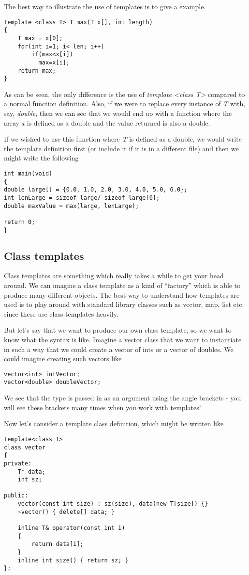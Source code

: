 The best way to illustrate the use of templates is to give a example. 

\begin{verbatim}
template <class T> T max(T x[], int length) 
{
	T max = x[0];
	for(int i=1; i< len; i++)
		if(max<x[i])
		  max=x[i];
	return max;
}
\end{verbatim}
As can be seen, the only difference is the use of \emph{template <class T>} compared to a normal function definition. Also, if we were to replace every instance of \emph{T} with, say, \emph{double}, then we can see that we would end up with a function where the array \emph{x} is defined as a double and the value returned is also a double. 

If we wished to use this function where \emph{T} is defined as a double, we would write the template definition first (or include it if it is in a different file) and then we might write the following
\begin{verbatim}
int main(void)
{
double large[] = {0.0, 1.0, 2.0, 3.0, 4.0, 5.0, 6.0};
int lenLarge = sizeof large/ sizeof large[0];
double maxValue = max(large, lenLarge);

return 0;
}
\end{verbatim}

\subsection{Class templates}

Class templates are something which really takes a while to get your
head around. We can imagine a class template as a kind of ``factory''
which is able to produce many different objects. The best way to
understand how templates are used is to play around with standard
library classes such as vector, map, list etc. since these use class
templates heavily. 

But let's say that we want to produce our own class template, so we
want to know what the syntax is like. Imagine a vector class that we
want to instantiate in such a way that we could create a vector of
ints or a vector of doubles. We could imagine creating such vectors
like
\begin{verbatim}
vector<int> intVector;
vector<double> doubleVector;
\end{verbatim}
We see that the type is passed in as an argument using the angle
brackets - you will see these brackets many times when you work with
templates!

Now let's consider a template class definition, which might be written
like 
\begin{lstlisting}
template<class T>
class vector
{
private:
	T* data;
	int sz;

public:
	vector(const int size) : sz(size), data(new T[size]) {}
	~vector() { delete[] data; }

	inline T& operator(const int i) 
	{
		return data[i];
	}
	inline int size() { return sz; }
};
\end{lstlisting}



